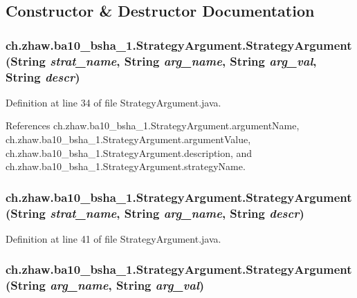 \subsection{Constructor \& Destructor Documentation}
\hypertarget{classch_1_1zhaw_1_1ba10__bsha__1_1_1StrategyArgument_a66be298497fd2bf1afb35984d52360b8}{
\subsubsection[{StrategyArgument}]{\setlength{\rightskip}{0pt plus 5cm}ch.zhaw.ba10\_\-bsha\_\-1.StrategyArgument.StrategyArgument (String {\em strat\_\-name}, \/  String {\em arg\_\-name}, \/  String {\em arg\_\-val}, \/  String {\em descr})}}
\label{classch_1_1zhaw_1_1ba10__bsha__1_1_1StrategyArgument_a66be298497fd2bf1afb35984d52360b8}


Definition at line 34 of file StrategyArgument.java.

References ch.zhaw.ba10\_\-bsha\_\-1.StrategyArgument.argumentName, ch.zhaw.ba10\_\-bsha\_\-1.StrategyArgument.argumentValue, ch.zhaw.ba10\_\-bsha\_\-1.StrategyArgument.description, and ch.zhaw.ba10\_\-bsha\_\-1.StrategyArgument.strategyName.\hypertarget{classch_1_1zhaw_1_1ba10__bsha__1_1_1StrategyArgument_a78121903280e3471780120ff923eb864}{
\subsubsection[{StrategyArgument}]{\setlength{\rightskip}{0pt plus 5cm}ch.zhaw.ba10\_\-bsha\_\-1.StrategyArgument.StrategyArgument (String {\em strat\_\-name}, \/  String {\em arg\_\-name}, \/  String {\em descr})}}
\label{classch_1_1zhaw_1_1ba10__bsha__1_1_1StrategyArgument_a78121903280e3471780120ff923eb864}


Definition at line 41 of file StrategyArgument.java.\hypertarget{classch_1_1zhaw_1_1ba10__bsha__1_1_1StrategyArgument_a1fd5b2ee140e28571e04c21059377290}{
\subsubsection[{StrategyArgument}]{\setlength{\rightskip}{0pt plus 5cm}ch.zhaw.ba10\_\-bsha\_\-1.StrategyArgument.StrategyArgument (String {\em arg\_\-name}, \/  String {\em arg\_\-val})}}
\label{classch_1_1zhaw_1_1ba10__bsha__1_1_1StrategyArgument_a1fd5b2ee140e28571e04c21059377290}


